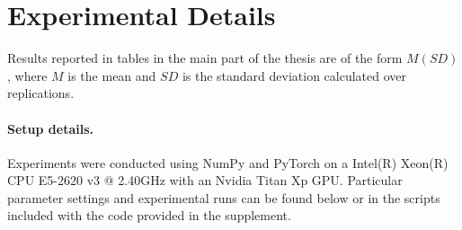 \section{Experimental Details}
 Results reported in tables in the main part of the thesis are of the form $M\scriptscriptstyle{(SD)}$, where $M$ is the mean and $SD$ is the standard deviation calculated over replications.

\paragraph{Setup details.} Experiments were conducted using NumPy and PyTorch on a Intel(R) Xeon(R) CPU E5-2620 v3 @ 2.40GHz with an Nvidia Titan Xp GPU. Particular parameter settings and experimental runs can be found below or in the scripts included with the code provided in the supplement.

